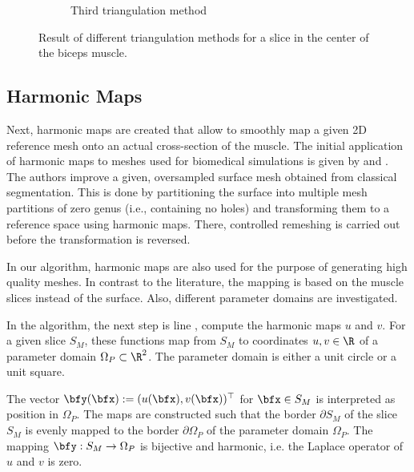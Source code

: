 \begin{figure}
\begin{subfigure}[t]{0.31\textwidth}
    \caption{Third triangulation method}%
    \label{fig:triangulation_2}%
  \end{subfigure}
  \caption{Result of different triangulation methods for a slice in the center of the biceps muscle.}%
  \label{fig:triangulations}%
\end{figure}%

\subsection{Harmonic Maps}

Next, harmonic maps are created that allow to smoothly map a given 2D reference mesh onto an actual cross-section of the muscle. The initial application of harmonic maps to meshes used for biomedical simulations is given by \cite{marchandise2010quality} and \cite{Marchandise2_2011}. The authors improve a given, oversampled surface mesh obtained from classical segmentation. This is done by partitioning the surface into multiple mesh partitions of zero genus (i.e., containing no holes) and transforming them to a reference space using harmonic maps. There, controlled remeshing is carried out before the transformation is reversed.

In our algorithm, harmonic maps are also used for the purpose of generating high quality meshes. In contrast to the literature, the mapping is based on the muscle slices instead of the surface. Also, different parameter domains are investigated.

In the algorithm, the next step is line , compute the harmonic maps $u$ and $v$. For a given slice $S_M$, these functions map from $S_M$ to coordinates $u,v\in \R$ of a parameter domain $\Omega_P \subset \R^2$. The parameter domain is either a unit circle or a unit square.

The vector $\bfy(\bfx) := (u(\bfx), v(\bfx))^\top$ for $\bfx \in S_M$ is interpreted as position in $\Omega_P$. The maps are constructed such that the border $∂S_M$ of the slice $S_M$ is evenly mapped to the border $∂\Omega_P$ of the parameter domain $\Omega_P$.
The mapping $\bfy: S_M \to \Omega_P$ is bijective and harmonic, i.e. the Laplace operator of $u$ and $v$ is zero.

